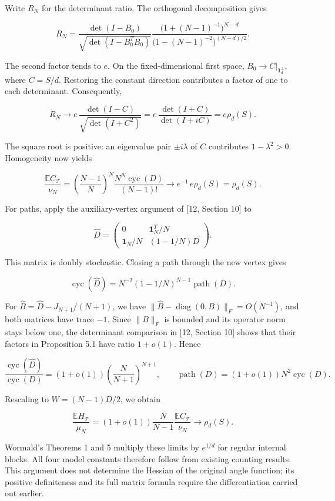 \documentclass[11pt,a4paper]{article}
\begin{document}
Write \(R_N\) for the determinant ratio. The orthogonal decomposition gives

\[
R_N=
\frac{\det(I-B_0)}{\sqrt{\det(I-B_0^TB_0)}}
\frac{\bigl(1+(N-1)^{-1}\bigr)^{N-d}}
{\bigl(1-(N-1)^{-2}\bigr)^{(N-d)/2}}.
\]

The second factor tends to \(e\). On the fixed-dimensional first space, \(B_0\to C|_{\mathbf1_d^\perp}\), where \(C=S/d\). Restoring the constant direction contributes a factor of one to each determinant. Consequently,

\[
R_N\longrightarrow
e\,\frac{\det(I-C)}{\sqrt{\det(I+C^2)}}
=e\,\frac{\det(I+C)}{\det(I+iC)}
=e\rho_d(S).
\]

The square root is positive: an eigenvalue pair \(\pm i\lambda\) of \(C\) contributes \(1-\lambda^2>0\). Homogeneity now yields

\[
\frac{\mathbb EC_{\mathcal T}}{\nu_N}
=\left(\frac{N-1}{N}\right)^N
\frac{N^N\operatorname{cyc}(D)}{(N-1)!}
\longrightarrow e^{-1}\,e\rho_d(S)=\rho_d(S).
\]

For paths, apply the auxiliary-vertex argument of {[}12, Section 10{]} to

\[
\widehat D=
\begin{pmatrix}
0&\mathbf1_N^T/N\\
\mathbf1_N/N&(1-1/N)D
\end{pmatrix}.
\]

This matrix is doubly stochastic. Closing a path through the new vertex gives

\[
\operatorname{cyc}(\widehat D)
=N^{-2}(1-1/N)^{N-1}\operatorname{path}(D).
\]

For \(\widehat B=\widehat D-J_{N+1}/(N+1)\), we have \(\|\widehat B-\operatorname{diag}(0,B)\|_F=O(N^{-1})\), and both matrices have trace \(-1\). Since \(\|B\|_F\) is bounded and its operator norm stays below one, the determinant comparison in {[}12, Section 10{]} shows that their factors in Proposition 5.1 have ratio \(1+o(1)\). Hence

\[
\frac{\operatorname{cyc}(\widehat D)}{\operatorname{cyc}(D)}
=(1+o(1))\left(\frac{N}{N+1}\right)^{N+1},
\qquad
\operatorname{path}(D)=(1+o(1))N^2\operatorname{cyc}(D).
\]

Rescaling to \(W=(N-1)D/2\), we obtain

\[
\frac{\mathbb EH_{\mathcal T}}{\mu_N}
=(1+o(1))\frac{N}{N-1}
\frac{\mathbb EC_{\mathcal T}}{\nu_N}
\longrightarrow\rho_d(S).
\]

Wormald's Theorems 1 and 5 multiply these limits by \(e^{1/d}\) for regular internal blocks. All four model constants therefore follow from existing counting results. This argument does not determine the Hessian of the original angle function; its positive definiteness and its full matrix formula require the differentiation carried out earlier.
\end{document}
